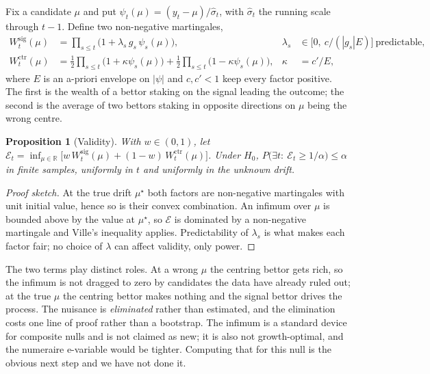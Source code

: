 \documentclass{article}
\newtheorem{proposition}[theorem]{Proposition}
\begin{document}
Fix a candidate $\mu$ and put $\psi_t(\mu)=(y_t-\mu)/\hat\sigma_t$, with $\hat\sigma_t$ the
running scale through $t-1$. Define two non-negative martingales,
\begin{align*}
  W^{\mathrm{sig}}_t(\mu) &= \textstyle\prod_{s\le t}\bigl(1+\lambda_s\,g_s\,\psi_s(\mu)\bigr),
  &\lambda_s &\in \bigl[0,\ c/(|g_s|E)\bigr] \ \text{predictable},\\
  W^{\mathrm{ctr}}_t(\mu) &= \textstyle\frac12\prod_{s\le t}\bigl(1+\kappa\psi_s(\mu)\bigr)
                        + \frac12\prod_{s\le t}\bigl(1-\kappa\psi_s(\mu)\bigr),
  &\kappa &= c'/E,
\end{align*}
where $E$ is an a-priori envelope on $|\psi|$ and $c,c'<1$ keep every factor positive. The
first is the wealth of a bettor staking on the signal leading the outcome; the second is the
average of two bettors staking in opposite directions on $\mu$ being the wrong centre.

\begin{proposition}[Validity]
\label{prop:validity}
With $w\in(0,1)$, let
$\mathcal{E}_t=\inf_{\mu\in\mathbb{R}}\bigl[w\,W^{\mathrm{sig}}_t(\mu)+(1-w)\,W^{\mathrm{ctr}}_t(\mu)\bigr]$.
Under $H_0$, $P\bigl(\exists t:\ \mathcal{E}_t\ge1/\alpha\bigr)\le\alpha$ in finite samples,
uniformly in $t$ and uniformly in the unknown drift.
\end{proposition}

\begin{proof}[Proof sketch]
At the true drift $\mu^\star$ both factors are non-negative martingales with unit initial
value, hence so is their convex combination. An infimum over $\mu$ is bounded above by the
value at $\mu^\star$, so $\mathcal{E}$ is dominated by a non-negative martingale and Ville's
inequality applies. Predictability of $\lambda_s$ is what makes each factor fair; no choice of
$\lambda$ can affect validity, only power.
\end{proof}

The two terms play distinct roles. At a wrong $\mu$ the centring bettor gets rich, so the
infimum is not dragged to zero by candidates the data have already ruled out; at the true
$\mu$ the centring bettor makes nothing and the signal bettor drives the process. The nuisance
is \emph{eliminated} rather than estimated, and the elimination costs one line of proof rather
than a bootstrap. The infimum is a standard device for composite nulls and is not claimed as
new; it is also not growth-optimal, and the numeraire e-variable \citep{larsson2025} would be
tighter. Computing that for this null is the obvious next step and we have not done it.
\end{document}

